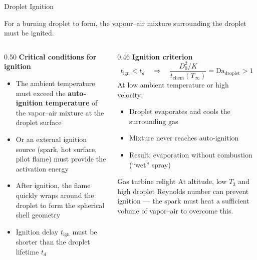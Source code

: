 \documentclass[12pt,aspectratio=169]{beamer}
\newcommand{\Da}{\mathrm{Da}}
\newcommand{\tchem}{t_{\text{chem}}}
\newcommand{\Kd}{K}
\newcommand{\td}{t_d}
\begin{document}
\begin{frame}{Droplet Ignition}

  For a burning droplet to form, the vapour--air mixture
  surrounding the droplet must be ignited.

  \begin{columns}[t]
    \begin{column}{0.50\textwidth}
      \textbf{Critical conditions for ignition}
      \begin{itemize}
        \item The ambient temperature must exceed the
              \textbf{auto-ignition temperature} of the vapor--air
              mixture at the droplet surface
        \item Or an external ignition source (spark, hot surface,
              pilot flame) must provide the activation energy
        \item After ignition, the flame quickly wraps around the
              droplet to form the spherical shell geometry
        \item Ignition delay $t_{\text{ign}}$ must be shorter than
              the droplet lifetime $\td$
      \end{itemize}
    \end{column}
    \begin{column}{0.46\textwidth}
      \textbf{Ignition criterion}
      \[
        t_{\text{ign}} < \td
        \quad\Rightarrow\quad
        \frac{D_0^2 / \Kd}{\tchem(T_\infty)}
        = \Da_{\text{droplet}} > 1
      \]
      At low ambient temperature or high velocity:
      \begin{itemize}
        \item Droplet evaporates and cools the surrounding gas
        \item Mixture never reaches auto-ignition
        \item Result: evaporation without combustion
              (``wet'' spray)
      \end{itemize}

      \begin{exampleblock}{Gas turbine relight}
        At altitude, low $T_3$ and high droplet Reynolds number
        can prevent ignition --- the spark must heat a sufficient
        volume of vapor--air to overcome this.
      \end{exampleblock}
    \end{column}
  \end{columns}
\end{frame}
\end{document}
